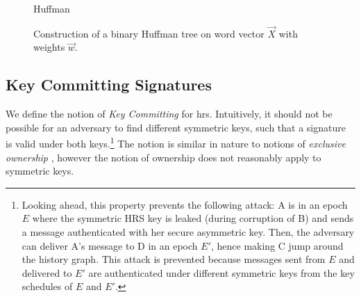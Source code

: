\begin{figure}[ht]
  \center
  \begin{algobox}{Huffman}
  \end{algobox}
  \caption{Construction of a binary Huffman tree on word vector $\vec{X}$ with weights $\vec{w}$.}
  \label{fig:huffman}
\end{figure}

\subsection{Key Committing Signatures} \label{sec:rkc}
We define the notion of \emph{Key Committing} for \acl{hrs}. Intuitively, it should not be possible for an adversary to find different symmetric keys, such that a signature is valid under both keys.\footnote{Looking
 ahead, this property prevents the following attack: A is in an epoch $E$ where the symmetric HRS key is leaked (during corruption of B) and sends a message authenticated with her secure asymmetric key. Then, the adversary can deliver A's message to D in an epoch $E'$, hence making C jump around the history graph. This attack is prevented because messages sent from $E$ and delivered to $E'$ are authenticated under different symmetric keys
 from the key schedules of $E$ and $E'$.} The notion is similar in nature to notions of \emph{exclusive  ownership}
\cite{EPRINT:BCJZ20}, however the notion of ownership does not reasonably apply to symmetric keys.


